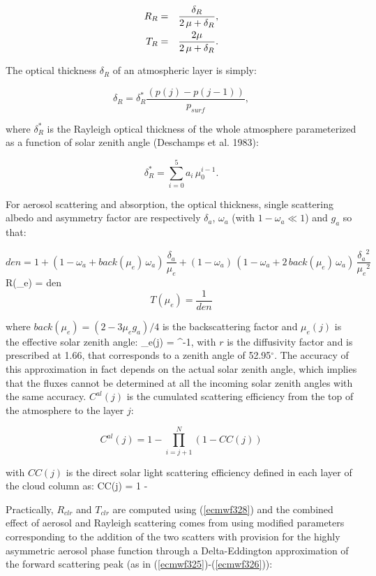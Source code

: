 \medskip
\begin{eqnarray}\label{ecmwf327}
R_R &=& \frac{\delta_R}{2 \, \mu + \delta_R}, \cr
T_R &=& \frac{2 \mu}{2 \, \mu + \delta_R}.
\end{eqnarray}
\medskip

The optical thickness $\delta_R$ of an atmospheric layer is simply:

\medskip
\[
\delta_R = \delta_R^{*} \frac{(p(j) - p(j-1))}{p_{surf}},
\]
\medskip

\noindent where $\delta_R^{*}$ is the Rayleigh optical thickness of the whole
atmosphere parameterized as a function of solar zenith angle
(Deschamps et al. 1983):

\[
\delta_R^{*} = \sum_{i=0}^5{a_i \, \mu_0^{i-1}}.
\]
\medskip

For aerosol scattering and absorption, the optical thickness, single scattering
albedo and asymmetry factor are respectively $\delta_a$, $\omega_a$ (with $1-\omega_a \ll 1$) and $g_a$ so that:

\medskip
\[
den = 1 + ( 1 - \omega_a + back(\mu_e) \, \omega_a ) \, \frac{\delta_a}{\mu_e} + ( 1 - \omega_a ) \, (1 - \omega_a + 2 \,  back(\mu_e) \, \omega_a ) \, \frac{{\delta_a}^2}{{\mu_e}^2}
\]
%
\be
R(\mu_e) =  {den}
\label{ecmwf328}
\ee
\[
T(\mu_e) = \frac{1}{den}
\]
\medskip

\noindent where $back(\mu_e) = (2 - 3 \mu_e g_a)/4$ is the
backscattering factor and $\mu_e(j)$ is the effective solar zenith angle:
\medskip
\be
\mu_e(j) = ^{-1},
\label{ecmwf315}
\ee
with $r$ is the diffusivity factor and is prescribed at 1.66, that corresponds to a zenith angle of 52.95$^\circ$. The accuracy of this approximation in fact depends on the actual solar zenith angle, which implies that the fluxes cannot be determined at all the incoming solar zenith angles with the same accuracy. $C^{al}(j)$ is the cumulated scattering efficiency from the top of the atmosphere to the layer $j$:
\noindent

\[
C^{al}(j) = 1 - \prod_{i=j+1}^N{(1 - CC(j))}
\]

\noindent
with $CC(j)$ is the direct solar light scattering efficiency defined in each layer of the cloud column as:
\be
CC(j) = 1 -\exp{}
\label{ecmwf316b}
\ee
\medskip

Practically, $R_{clr}$ and $T_{clr}$ are computed using (\ref{ecmwf328}) and the
combined effect of aerosol and Rayleigh scattering comes from using modified
parameters corresponding to the addition of the two scatters with provision for
the highly asymmetric aerosol phase function through a Delta-Eddington
approximation of the forward scattering peak
(as in (\ref{ecmwf325})-(\ref{ecmwf326})):

